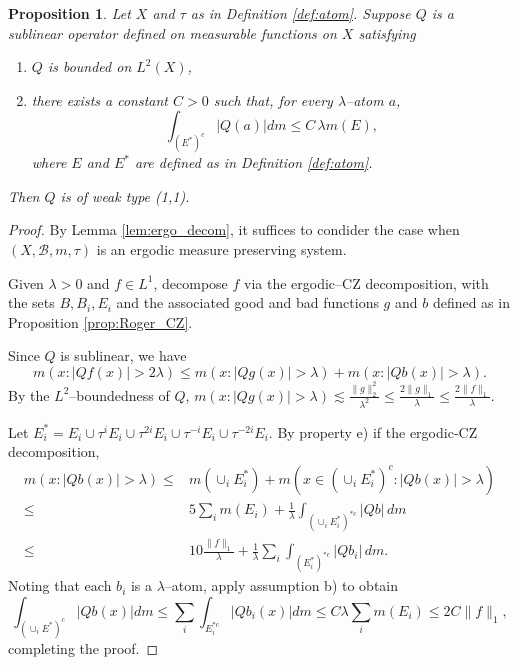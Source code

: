 \documentclass[11pt]{amsart}
\newtheorem{prop}[thm]{Proposition}
\theoremstyle{definition}
\theoremstyle{remark}
\begin{document}
\begin{prop} \label{prop:atoms}
Let  $X$ and $\tau$ as in Definition \ref{def:atom}. 
Suppose $Q$ is a sublinear operator defined on measurable functions on $X$ satisfying
\begin{enumerate}
\item $Q$ is bounded on $L^2(X)$,
\item there exists a constant $C>0$ such that, for every $\lambda$--atom $a$,
\[\int_{(E^*)^c} |Q(a)| dm \le C \, \lambda m(E),\] where %
   $E$ and $E^*$ are defined as in Definition \ref{def:atom}.
\end{enumerate}
Then $Q$ is of weak type (1,1). 
\end{prop}

\begin{proof}
By Lemma \ref{lem:ergo_decom}, it suffices to condider the case when $(X, \mathcal B, m,\tau)$ is an ergodic measure preserving system.

Given $\lambda>0$ and $f\in L^1$, decompose $f$  via the ergodic--CZ decomposition, with the sets $B,B_i, E_i$ 
and the associated good and bad functions $g$ and $b$ defined as in Proposition \ref{prop:Roger_CZ}.

Since $Q$ is sublinear, we have
\[
m(x:|Q f(x)|>2\lambda)\le  m(x:|Q g(x)|>\lambda) + m(x:|Q b(x)|>\lambda).\]
By the  $L^2$--boundedness of $Q$,
 $ m(x:|Q g(x)|>\lambda) \lesssim \frac{\lVert g\rVert_2^2}{\lambda^2} \le  \frac{2\lVert g\rVert_1}{\lambda}  
\le  \frac{2\lVert f\rVert_1}{\lambda}.
$ 

Let $E_i^*=E_i\cup \tau^{i}E_i \cup \tau^{2 i}E_i  \cup \tau^{-i} E_i \cup \tau^{-2i} E_i$.
By property e) if the ergodic-CZ decomposition,
\begin{align*}
m(x:|Q b(x)|> \lambda)\le  &
m(\cup_i E^*_i)+
m(x\in (\cup_i E^*_i)^{c}: |Q b(x)|>\lambda)\\
\le & 5 \sum_i m(E_i) + \frac 1{\lambda} \int_{(\cup_i E^*_i)^{*c}} |Q b|\, dm \\
\le & 10 \frac{\lVert f\rVert_1}{\lambda} +  \frac 1{\lambda} \sum_i \int_{(E^*_i)^{*c}} |Q b_i|\, dm. 
\end{align*}
Noting that each $b_i$ is a $\lambda$--atom, apply assumption b) %
to obtain
\[ \int_{(\cup_i E^*)^c} |Q b(x)| dm \le \sum_i  \int_{E_i^{*c}} |Q b_i(x)| dm \le C \lambda \sum_i  m(E_i) \le 2 C \|f\|_1,\]
completing the proof.
\end{proof}
\end{document}
